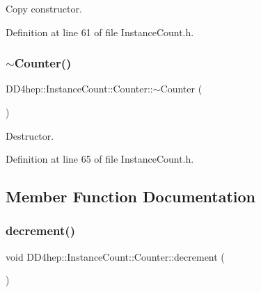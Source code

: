 Copy constructor. 



Definition at line 61 of file Instance\+Count.\+h.

\hypertarget{class_d_d4hep_1_1_instance_count_1_1_counter_a6bd715538db93a8e4b4f9a27c4b0c793}{}\label{class_d_d4hep_1_1_instance_count_1_1_counter_a6bd715538db93a8e4b4f9a27c4b0c793} 
\subsubsection{\texorpdfstring{$\sim$\+Counter()}{~Counter()}}
{\footnotesize\ttfamily D\+D4hep\+::\+Instance\+Count\+::\+Counter\+::$\sim$\+Counter (\begin{DoxyParamCaption}{ }\end{DoxyParamCaption})\hspace{0.3cm}{\ttfamily [inline]}}



Destructor. 



Definition at line 65 of file Instance\+Count.\+h.



\subsection{Member Function Documentation}
\hypertarget{class_d_d4hep_1_1_instance_count_1_1_counter_abe6d3ce948fd3c9a990054bf44737054}{}\label{class_d_d4hep_1_1_instance_count_1_1_counter_abe6d3ce948fd3c9a990054bf44737054} 
\subsubsection{\texorpdfstring{decrement()}{decrement()}}
{\footnotesize\ttfamily void D\+D4hep\+::\+Instance\+Count\+::\+Counter\+::decrement (\begin{DoxyParamCaption}{ }\end{DoxyParamCaption})\hspace{0.3cm}{\ttfamily [inline]}}



